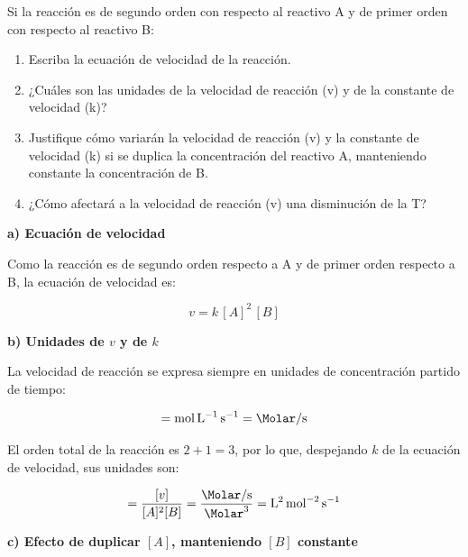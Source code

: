 \begin{exerciseEVAU}
    Si la reacción  es de segundo orden con respecto al reactivo A y de primer orden con respecto al reactivo B:
    \begin{enumerate}[label=\letraminuscula]
        \item Escriba la ecuación de velocidad de la reacción.
        \item ¿Cuáles son las unidades de la velocidad de reacción (v) y de la constante de
        velocidad (k)?
        \item Justifique cómo variarán la velocidad de reacción (v) y la constante de
        velocidad (k) si se duplica la concentración del reactivo A, manteniendo constante la
        concentración de B.
        \item ¿Cómo afectará a la velocidad de reacción (v) una disminución de la T?

    \end{enumerate}

    \begin{solu}

        \textbf{a) Ecuación de velocidad}

        Como la reacción es de segundo orden respecto a A y de primer orden respecto a B, la ecuación de velocidad es:

        \begin{equation*}
            v = k\, [A]^2\, [B]
        \end{equation*}

        \textbf{b) Unidades de \(v\) y de \(k\)}

        La velocidad de reacción se expresa siempre en unidades de concentración partido de tiempo:

        \begin{equation*}
            [v] = \si{\mole\per\litre\per\s} = \si{\Molar\per\s}
        \end{equation*}

        El orden total de la reacción es \(2 + 1 = 3\), por lo que, despejando \(k\) de la ecuación de velocidad, sus unidades son:

        \begin{equation*}
            [k] = \dfrac{[v]}{[A]^2[B]} = \dfrac{\si{\Molar\per\s}}{\si{\Molar^3}} = \si{\square\litre\per\square\mole\per\s}
        \end{equation*}

        \textbf{c) Efecto de duplicar \([A]\), manteniendo \([B]\) constante}


\end{solu}
\end{exerciseEVAU}
